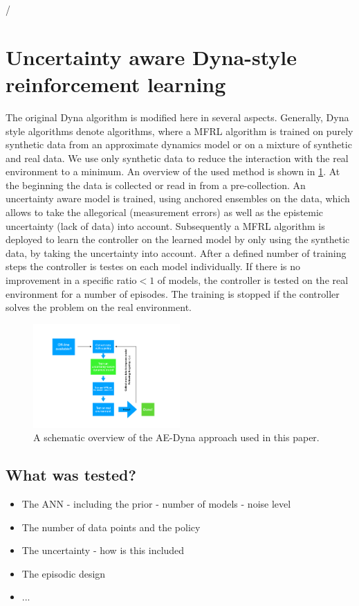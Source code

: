 \documentclass[
 reprint,
 amsmath,amssymb,amsfonts,clevref,
 aps,
prstab,
]{revtex4-2}
\begin{document}
/
\section{Uncertainty aware Dyna-style reinforcement learning}
The original Dyna algorithm \cite{DYNA} is modified here in several aspects. Generally, Dyna style algorithms denote algorithms, where a MFRL algorithm is trained on purely synthetic data from an approximate dynamics model or on a mixture of synthetic and real data. We use only synthetic data to reduce the interaction with the real environment to a minimum.
An overview of the used method is shown in \cref{fig:MBRL_overview}. At the beginning the data is collected or read in from a pre-collection. An uncertainty aware model is trained, using anchored ensembles on the data, which allows to take the allegorical (measurement errors) as well as the epistemic uncertainty (lack of data) into account. Subsequently a MFRL algorithm is deployed to learn the controller on the learned model by only using the synthetic data, by taking the uncertainty into account. After a defined number of training steps the controller is testes on each model individually. If there is no improvement in a specific ratio$<1$ of models, the controller is tested on the real environment for a number of episodes. The training is stopped if the controller solves the problem on the real environment.

\begin{figure}[!h]
	\centering
	\includegraphics*[width=0.5\textwidth]{Figures/MBRL_overview}
	\caption{A schematic overview of the AE-Dyna approach used in this paper.}
	\label{fig:MBRL_overview}
\end{figure}
\subsection{What was tested?}
\begin{itemize}
	\item The ANN - including the prior - number of models - noise level
	\item The number of data points and the policy
	\item The uncertainty - how is this included
	\item The episodic design
	\item ...
\end{itemize}
\end{document}
